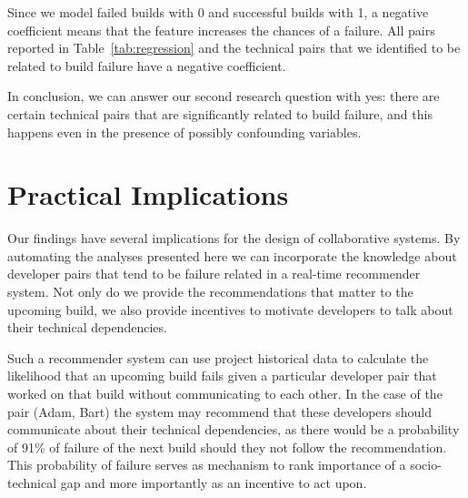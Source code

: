 \documentclass[12pt,oneside]{book}
\begin{document}
Since we model failed builds with 0 and successful builds with 1, a negative coefficient means that the feature increases the chances of a failure.
All pairs reported in Table~\ref{tab:regression} and the technical pairs that we identified to be related to build failure have a negative coefficient.
 

In conclusion, we can answer our second research question with yes: there are
certain technical pairs that are significantly related to build failure, and
this happens even in the presence of possibly confounding variables. 







%







\section{Practical Implications}
\label{sec:implications}
Our findings have several implications for the design of collaborative systems.
By automating the analyses presented here we can incorporate the knowledge about
developer pairs that tend to be failure related in a real-time recommender
system. Not only do we provide the recommendations that matter to the upcoming
build, we also provide incentives to motivate developers to talk about their
technical dependencies. 

Such a recommender system can use project historical data to
calculate the likelihood that an upcoming build fails given a particular
developer pair that worked on that build without communicating to each other. In
the case of the pair (Adam, Bart) the system may recommend that these
developers should communicate about their technical dependencies, as there
would be a probability
of 91\% of failure of the next build should they not follow the
recommendation. This probability of failure serves as mechanism to
rank importance of a socio-technical gap and more importantly as an
incentive to act upon.
\end{document}

